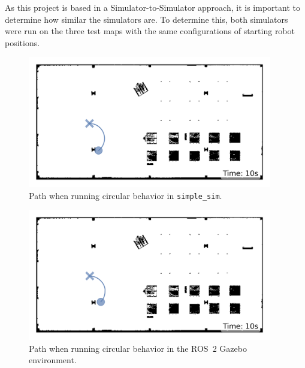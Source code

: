 As this project is based in a Simulator-to-Simulator approach, it is important to determine how similar the simulators are. To determine this, both simulators were run on the three test maps with the same configurations of starting robot positions.

\begin{figure}[H]
    \begin{center}
        \includegraphics[width=0.95\textwidth]{./figures/consistency/simple-sim-paths-(after-10s)_rough_tune.png}
    \end{center}
    \caption{Path when running circular behavior in \texttt{simple\_sim}.}
    \label{fig:movement-simple-benchmark}
\end{figure}
\begin{figure}[H]
    \begin{center}
        \includegraphics[width=0.95\textwidth]{./figures/consistency/ros-2-paths-(after-10s)_rough_tune.png}
    \end{center}
    \caption{Path when running circular behavior in the ROS~2 Gazebo environment.}
    \label{fig:movement-ros2-benchmark}
\end{figure}

